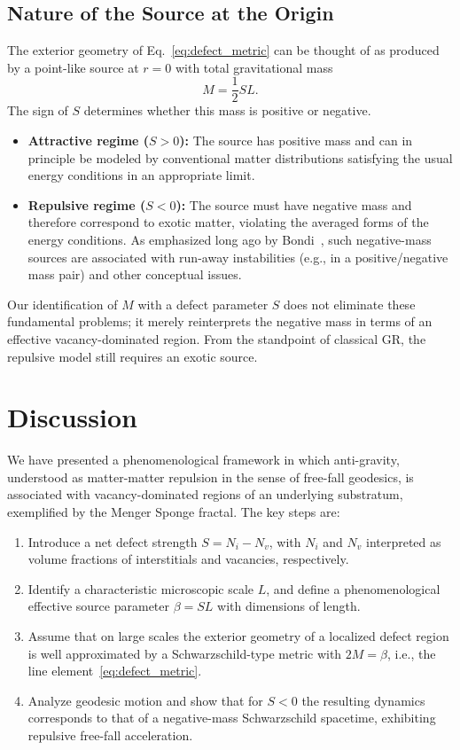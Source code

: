\documentclass[%
  reprint,
  superscriptaddress,
  showpacs,
  showkeys,
  amsmath,amssymb,
  pra,
  longbibliography,
  floatfix,
  x11names
]{revtex4-2}
\begin{document}
\subsection{Nature of the Source at the Origin}

The exterior geometry of Eq.~\eqref{eq:defect_metric} can be thought of as produced by a point-like source at \(r=0\) with total gravitational mass
\begin{equation}
M = \frac{1}{2} SL.
\end{equation}
The sign of \(S\) determines whether this mass is positive or negative.

\begin{itemize}
\item \textbf{Attractive regime (\(S>0\)):} The source has positive mass and can in principle be modeled by conventional matter distributions satisfying the usual energy conditions in an appropriate limit.
\item \textbf{Repulsive regime (\(S<0\)):} The source must have negative mass and therefore correspond to exotic matter, violating the averaged forms of the energy conditions. As emphasized long ago by Bondi~\cite{bondi-1957}, such negative-mass sources are associated with run-away instabilities (e.g., in a positive/negative mass pair) and other conceptual issues.
\end{itemize}

Our identification of \(M\) with a defect parameter \(S\) does not eliminate these fundamental problems; it merely reinterprets the negative mass in terms of an effective vacancy-dominated region. From the standpoint of classical GR, the repulsive model still requires an exotic source.

\section{Discussion}
\label{sec:discuss}

We have presented a phenomenological framework in which anti-gravity, understood as matter-matter repulsion in the sense of free-fall geodesics, is associated with vacancy-dominated regions of an underlying substratum, exemplified by the Menger Sponge fractal. The key steps are:

\begin{enumerate}
\item Introduce a net defect strength \(S = N_i - N_v\), with \(N_i\) and \(N_v\) interpreted as volume fractions of interstitials and vacancies, respectively.
\item Identify a characteristic microscopic scale \(L\), and define a phenomenological effective source parameter \(\beta = SL\) with dimensions of length.
\item Assume that on large scales the exterior geometry of a localized defect region is well approximated by a Schwarzschild-type metric with \(2M = \beta\), i.e., the line element~\eqref{eq:defect_metric}.
\item Analyze geodesic motion and show that for \(S<0\) the resulting dynamics corresponds to that of a negative-mass Schwarzschild spacetime, exhibiting repulsive free-fall acceleration.
\end{enumerate}
\end{document}
